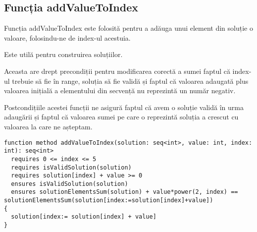 \subsection{Funcția addValueToIndex}
Funcția addValueToIndex este folosită pentru a adăuga unui element din soluție o valoare, folosindu-ne de index-ul acestuia.\par
Este utilă pentru construirea soluțiilor.\par
Aceasta are drept precondiții pentru modificarea corectă a sumei faptul că index-ul trebuie să fie în range, soluția să fie validă și
faptul că valoarea adaugată plus valoarea inițială a elementului din secvență nu reprezintă un număr negativ.\par
Postcondițiile acestei funcții ne asigură faptul că avem o soluție validă în urma adaugării și faptul că valoarea sumei pe care 
o reprezintă soluția a crescut cu valoarea la care ne așteptam.\par
\begin{lstlisting}
function method addValueToIndex(solution: seq<int>, value: int, index: int): seq<int>
  requires 0 <= index <= 5
  requires isValidSolution(solution)
  requires solution[index] + value >= 0
  ensures isValidSolution(solution)
  ensures solutionElementsSum(solution) + value*power(2, index) == solutionElementsSum(solution[index:=solution[index]+value])
{
  solution[index:= solution[index] + value]
}
\end{lstlisting}
